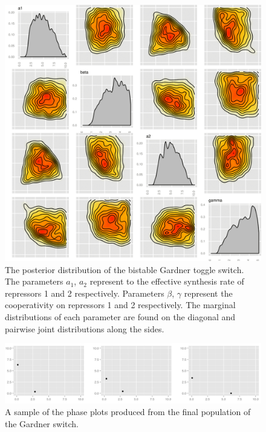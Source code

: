 \cleardoublepage
\begin{figure}[t]
\centering
\includegraphics[scale=0.2]{chapterModelling/images/Gardner/posterior.png}
\caption[The posterior distribution of the bistable Gardner toggle switch]{The posterior distribution of the bistable Gardner toggle switch. The parameters $a_1$, $a_2$ represent to the effective synthesis rate of repressors 1 and 2 respectively. Parameters $\beta$, $\gamma$ represent the cooperativity on repressors 1 and 2 respectively. The marginal distributions of each parameter are found on the diagonal and pairwise joint distributions along the sides.}
\label{fig:Gard_post}
\end{figure}


\begin{figure}[t]
\centering
\includegraphics[scale=0.3]{chapterModelling/images/Gardner/phase_plots.png}
\caption{A sample of the phase plots produced from the final population of the Gardner switch.}
\label{fig:det_gard_phase}
\end{figure}

